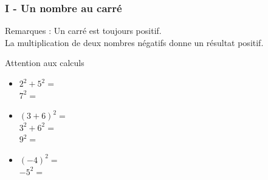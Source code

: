 \documentclass{beamer}
\begin{document}
\begin{frame}
  \frametitle{I - Un nombre au carré}

  \begin{block}{}
    Remarques : Un carré est toujours positif.\\
	La multiplication de deux nombres négatifs donne un résultat positif. 
  \end{block}

  \begin{alertblock}{Attention aux calculs}
    \begin{itemize}
    \item $2^2 + 5^2 = $\\
      $7^2 = $
    \item $(3+6)^2 = $\\
      $3^2 + 6^2 = $\\
      $9^2 =$
    \item $(-4) ^2 = $\\
      $-5^2 = $
    \end{itemize}
  \end{alertblock}

\end{frame}
\end{document}
